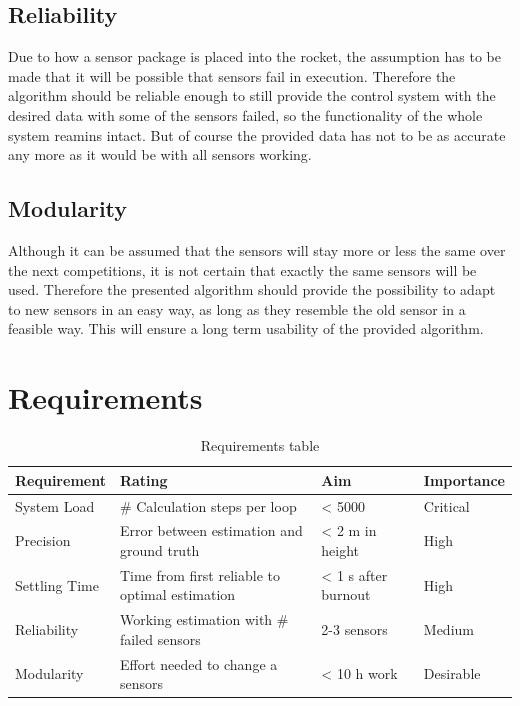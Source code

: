  \subsection{Reliability}
 Due to how a sensor package is placed into the rocket, the assumption has to be made that it will be possible that sensors fail in execution.
 Therefore the algorithm should be reliable enough to still provide the control system with the desired data with some of the sensors failed, so the functionality of the whole system reamins intact. But of course the provided data has not to be as accurate any more as it would be with all sensors working.

 \subsection{Modularity}
 Although it can be assumed that the sensors will stay more or less the same over the next competitions, it is not certain that exactly the same sensors will be used.
 Therefore the presented algorithm should provide the possibility to adapt to new sensors in an easy way, as long as they resemble the old sensor in a feasible way.
 This will ensure a long term usability of the provided algorithm.

 \section{Requirements}

 \begin{table}[h]
 \centering
 \begin{tabular}{|l|l|l|l|}
 \hline
 \bf{Requirement}   & \bf{Rating} & \bf{Aim} & \bf{Importance} \\ \hline
 System Load   & \# Calculation steps per loop & < 5000 & Critical \\ \hline
 Precision     & Error between estimation and ground truth  & < 2 m in height & High  \\ \hline
 Settling Time & Time from first reliable to optimal estimation  & < 1 s after burnout &  High \\ \hline
 Reliability   & Working estimation with \# failed sensors & 2-3 sensors & Medium \\ \hline
 Modularity    & Effort needed to change a sensors & < 10 h work &  Desirable \\ \hline
 \end{tabular}
 \caption{Requirements table}
 \label{tab:Requirements}
 \end{table}

